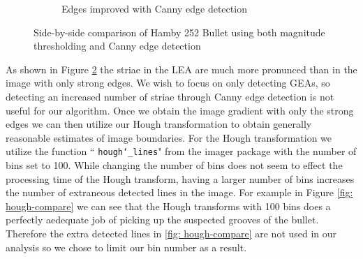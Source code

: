 \documentclass[12pt]{article}
\theoremstyle{nonumberplain}
\begin{document}
\begin{figure}[!ht]
\begin{subfigure}{.5\textwidth}
      \caption{Edges improved with Canny edge detection}
      \label{fig: edge2}
      \end{subfigure}
      \caption{Side-by-side comparison of Hamby 252 Bullet using both magnitude thresholding and Canny edge detection}
      \label{fig: canny}
\end{figure}

As shown in Figure \ref{fig: canny} the striae in the LEA are much more pronunced than in the image with only strong edges. We wish to focus on only detecting GEAs, so detecting an increased number of striae through Canny edge detection is not useful for our algorithm. Once we obtain the image gradient with only the strong edges we can then utilize our Hough transformation to obtain generally reasonable estimates of image boundaries. For the Hough transformation we utilize the function `` \texttt{hough\char`_lines}" from the imager package with the number of bins set to 100. While changing the number of bins does not seem to effect the processing time of the Hough transform, having a larger number of bins increases the number of extraneous detected lines in the image. For example in Figure \ref{fig: hough-compare} we can see that the Hough transforms with 100 bins does a perfectly aedequate job of picking up the suspected grooves of the bullet. Therefore the extra detected lines in \ref{fig: hough-compare} are not used in our analysis so we chose to limit our bin number as a result.
\end{document}
